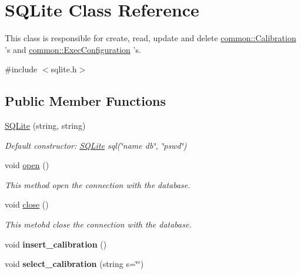 \hypertarget{classSQLite}{\section{S\-Q\-Lite Class Reference}
\label{classSQLite}
}


This class is responsible for create, read, update and delete \hyperlink{structcommon_1_1Calibration}{common\-::\-Calibration} 's and \hyperlink{structcommon_1_1ExecConfiguration}{common\-::\-Exec\-Configuration} 's.  




{\ttfamily \#include $<$sqlite.\-h$>$}

\subsection*{Public Member Functions}
\begin{DoxyCompactItemize}
\item 
\hypertarget{classSQLite_aec016ee26d918bb715383b7578118166}{\hyperlink{classSQLite_aec016ee26d918bb715383b7578118166}{S\-Q\-Lite} (string, string)}\label{classSQLite_aec016ee26d918bb715383b7578118166}

\begin{DoxyCompactList}\small\item\em Default constructor\-: \hyperlink{classSQLite}{S\-Q\-Lite} sql(\char`\"{}name db\char`\"{}, \char`\"{}pswd\char`\"{}) \end{DoxyCompactList}\item 
void \hyperlink{classSQLite_a2ba6d61d356aac7b2a0d7323ba997279}{open} ()
\begin{DoxyCompactList}\small\item\em This method open the connection with the database. \end{DoxyCompactList}\item 
\hypertarget{classSQLite_aac5338faf7580f6adb3560c91d58b54a}{void \hyperlink{classSQLite_aac5338faf7580f6adb3560c91d58b54a}{close} ()}\label{classSQLite_aac5338faf7580f6adb3560c91d58b54a}

\begin{DoxyCompactList}\small\item\em This metohd close the connection with the database. \end{DoxyCompactList}\item 
\hypertarget{classSQLite_ae145e41fed72678f0e2900ec093ad323}{void {\bfseries insert\-\_\-calibration} ()}\label{classSQLite_ae145e41fed72678f0e2900ec093ad323}

\item 
\hypertarget{classSQLite_aeb720971a449cc51d124251fa995cb5c}{void {\bfseries select\-\_\-calibration} (string s=\char`\"{}\char`\"{})}\label{classSQLite_aeb720971a449cc51d124251fa995cb5c}

\end{DoxyCompactItemize}
